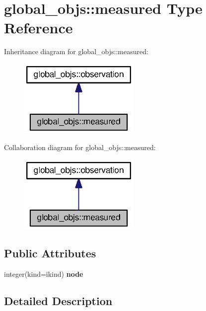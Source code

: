 \section{global\+\_\+objs\+:\+:measured Type Reference}
\label{structglobal__objs_1_1measured}


Inheritance diagram for global\+\_\+objs\+:\+:measured\+:\nopagebreak
\begin{figure}[H]
\begin{center}
\leavevmode
\includegraphics[width=166pt]{structglobal__objs_1_1measured__inherit__graph}
\end{center}
\end{figure}


Collaboration diagram for global\+\_\+objs\+:\+:measured\+:\nopagebreak
\begin{figure}[H]
\begin{center}
\leavevmode
\includegraphics[width=166pt]{structglobal__objs_1_1measured__coll__graph}
\end{center}
\end{figure}
\subsection*{Public Attributes}
\begin{DoxyCompactItemize}
\item 
integer(kind=ikind) {\bf node}
\end{DoxyCompactItemize}


\subsection{Detailed Description}


